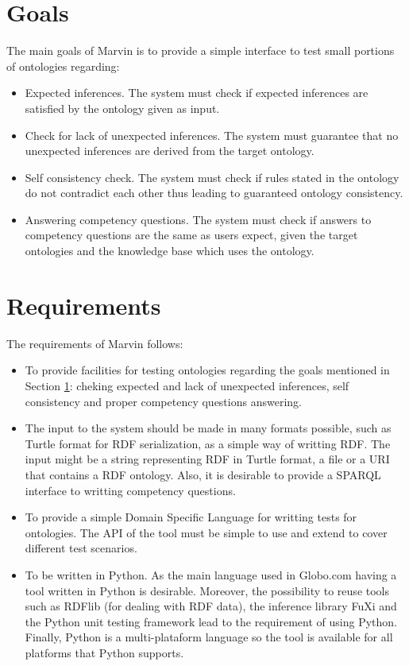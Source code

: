 \documentclass{report}
\begin{document}
\section{Goals}
\label{goals}

The main goals of Marvin is to provide a simple interface to test small portions of ontologies regarding:

\begin{itemize}
    \item Expected inferences. The system must check if expected inferences are satisfied by the ontology
        given as input.
    \item Check for lack of unexpected inferences. The system must guarantee that no unexpected inferences are
        derived from the target ontology.
    \item Self consistency check. The system must check if rules stated in the ontology do not
        contradict each other thus leading to guaranteed ontology consistency.
    \item Answering competency questions. The system must check if answers to competency questions are
        the same as users expect, given the target ontologies and the knowledge base which uses the ontology.
\end{itemize}

\section{Requirements}
\label{requirements}

The requirements of Marvin follows:
\begin{itemize}
    \item To provide facilities for testing ontologies regarding the goals mentioned in Section \ref{goals}: cheking
        expected and lack of unexpected inferences, self consistency and proper competency questions answering.
    \item The input to the system should be made in many formats possible, such as Turtle format for RDF serialization,
        as a simple way of writting RDF. The input might be a string representing RDF in Turtle format, a file or a
        URI that contains a RDF ontology. Also, it is desirable to provide a SPARQL interface to writting competency questions.
    \item To provide a simple Domain Specific Language for writting tests for ontologies. The API of the tool must be simple
        to use and extend to cover different test scenarios.
    \item To be written in Python. As the main language used in Globo.com having a tool written in Python is desirable.
        Moreover, the possibility to reuse tools such as RDFlib (for dealing with RDF data), the inference library FuXi
        and the Python unit testing framework lead to the requirement of using Python.
        Finally, Python is a multi-plataform language so the tool is available for all platforms that Python supports.
\end{itemize}
\end{document}
